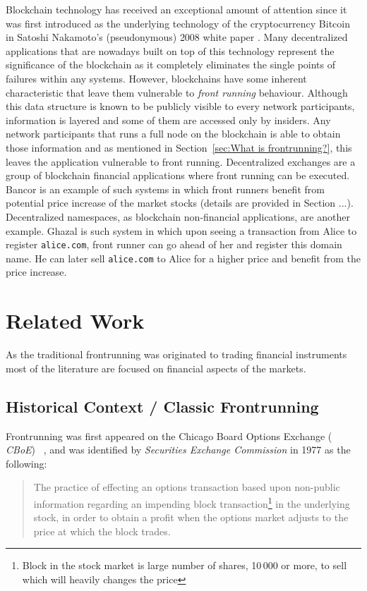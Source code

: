 Blockchain technology has received an exceptional amount of attention since it was first introduced as the underlying technology of the cryptocurrency Bitcoin in Satoshi Nakamoto's (pseudonymous) 2008 white paper \cite{nakamoto2008bitcoin}. Many decentralized applications that are nowadays built on top of this technology represent the significance of the blockchain as it completely eliminates the single points of failures within any systems. However, blockchains have some inherent characteristic that leave them vulnerable to \emph{front running} behaviour. Although this data structure is known to be publicly visible to every network participants, information is layered  and some of them are accessed only by insiders. Any network participants that runs a full node on the blockchain is able to obtain those information and as mentioned in Section~\ref{sec:What is frontrunning?}, this leaves the application vulnerable to front running. Decentralized exchanges are a group of blockchain financial applications where front running can be executed. Bancor \cite{hertzog2017bancor} is an example of such systems in which front runners benefit from potential price increase of the market stocks (details are provided in Section ...). Decentralized namespaces, as blockchain non-financial applications, are another example. Ghazal \cite{moosavighazal} is such system in which upon seeing a transaction from Alice to register \texttt{alice.com}, front runner can go ahead of her and register this domain name. He can later sell \texttt{alice.com} to Alice for a higher price and benefit from the price increase.






\section{Related Work}
As the traditional frontrunning was originated to trading financial instruments most of the literature are focused on financial aspects of the markets. %


\subsection{Historical Context / Classic Frontrunning}
Frontrunning was first appeared on the Chicago Board Options Exchange ( \textit{CBoE}) ~\cite{markham1988front}, and was identified by \textit{Securities Exchange Commission} in 1977 as the following:
\begin{quote}
The practice of effecting an options transaction based upon non-public information regarding an impending block transaction\footnote{Block in the stock market is large number of shares, 10\,000 or more, to sell which will heavily changes the price} in the underlying stock, in order to obtain a profit when the options market adjusts to the price at which the block trades. ~\cite{sec1978optionsmarket}
\end{quote} 


